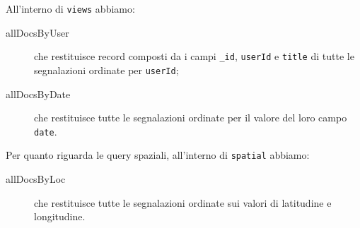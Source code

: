                 All'interno di \texttt{views} abbiamo:
                \begin{description}
                    \item[allDocsByUser] che restituisce record composti da i
                    campi \texttt{\_id}, \texttt{userId} e \texttt{title} di
                    tutte le segnalazioni ordinate per \texttt{userId};
                    \item[allDocsByDate] che restituisce tutte le segnalazioni
                    ordinate per il valore del loro campo \texttt{date}.
                \end{description}

                Per quanto riguarda le query spaziali, all'interno di
                \texttt{spatial} abbiamo:
                \begin{description}
                    \item[allDocsByLoc] che restituisce tutte le segnalazioni
                    ordinate sui valori di latitudine e longitudine.
                \end{description}

